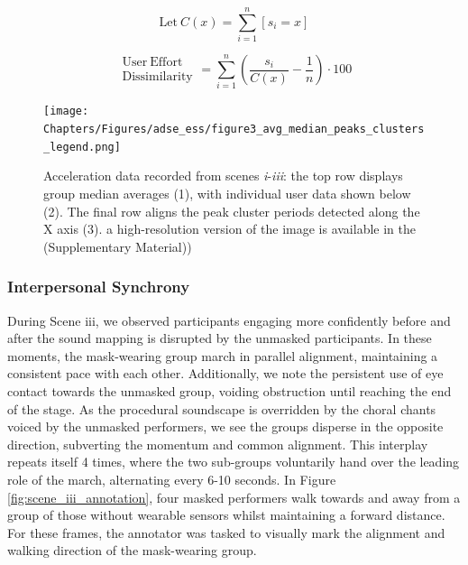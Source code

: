 \begin{figure}
\[
 \mathrm{Let}\ C(x)=\sum_{i=1}^{n}[s_i=x]
\]

\begin{equation}
\begin{split}
\mathrm{User\ Effort\ }\\ \mathrm{Dissimilarity}
\end{split}
= \sum_{i=1}^{n} (\frac{s_i}{C(x)} - \frac{1}{n})\cdot100
\end{equation}
\end{figure}

\begin{adjustwidth}{-9cm}{}
\begin{figure}[!h]
\centering
\texttt{[image: Chapters/Figures/adse\_ess/figure3\_avg\_median\_peaks\_clusters\_legend.png]}
\caption[Acceleration data recorded from scenes]{Acceleration data recorded from scenes \textit{i}-\textit{iii}: the top row displays group median averages (1), with individual user data shown below (2). The final row aligns the peak cluster periods detected along the X axis (3).
a high-resolution version of the image is available in the (Supplementary Material))}\label{fig:sensor_data}
\vspace*{-20pt}
\end{figure}
\end{adjustwidth}

\subsubsection{Interpersonal Synchrony}

During Scene iii, we observed participants engaging more confidently before and after the sound mapping is disrupted by the unmasked participants. In these moments, the mask-wearing group march in parallel alignment, maintaining a consistent pace with each other. Additionally, we note the persistent use of eye contact towards the unmasked group, voiding obstruction until reaching the end of the stage. As the procedural soundscape is overridden by the choral chants voiced by the unmasked performers, we see the groups disperse in the opposite direction, subverting the momentum and common alignment. This interplay repeats itself 4 times, where the two sub-groups voluntarily hand over the leading role of the march, alternating every 6-10 seconds. In Figure \ref{fig:scene_iii_annotation}, four masked performers walk towards and away from a group of those without wearable sensors whilst maintaining a forward distance. For these frames, the annotator was tasked to visually mark the alignment and walking direction of the mask-wearing group.

